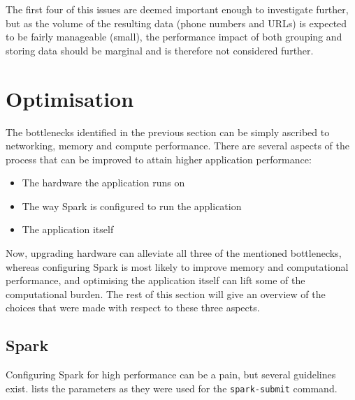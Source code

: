 \documentclass{article}
\begin{document}
The first four of this issues are deemed important enough to investigate further, but as the volume of the resulting data (phone numbers and URLs) is expected to be fairly manageable (small), the performance impact of both grouping and storing data should be marginal and is therefore not considered further.

\section{Optimisation}

The bottlenecks identified in the previous section can be simply ascribed to networking, memory and compute performance.
There are several aspects of the process that can be improved to attain higher application performance:

\begin{itemize}
	\item The hardware the application runs on
	\item The way Spark is configured to run the application
	\item The application itself
\end{itemize}

Now, upgrading hardware can alleviate all three of the mentioned bottlenecks, whereas configuring Spark is most likely to improve memory and computational performance, and optimising the application itself can lift some of the computational burden.
The rest of this section will give an overview of the choices that were made with respect to these three aspects.

\subsection{Spark}
Configuring Spark for high performance can be a pain, but several guidelines exist.
 lists the parameters as they were used for the \texttt{spark-submit} command.
\end{document}
